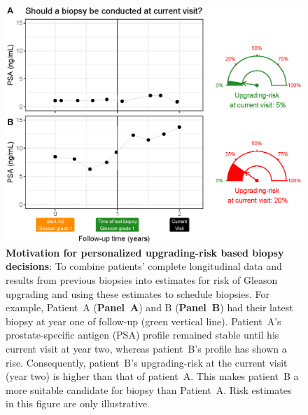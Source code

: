 \begin{figure}
\centerline{\includegraphics[width=\columnwidth]{images/riskBasedExample.eps}}
\caption{\textbf{Motivation for personalized upgrading-risk based biopsy decisions}: To combine patients' complete longitudinal data and results from previous biopsies into estimates for risk of Gleason upgrading and using these estimates to schedule biopsies. For example, Patient~A (\textbf{Panel~A}) and B (\textbf{Panel~B}) had their latest biopsy at year one of follow-up (green vertical line). Patient~A's prostate-specific antigen (PSA) profile remained stable until his current visit at year two, whereas patient~B's profile has shown a rise. Consequently, patient~B's upgrading-risk at the current visit (year two) is higher than that of patient~A. This makes patient~B a more suitable candidate for biopsy than Patient~A. Risk estimates in this figure are only illustrative.}
\label{fig:riskBasedExample}
\end{figure}

